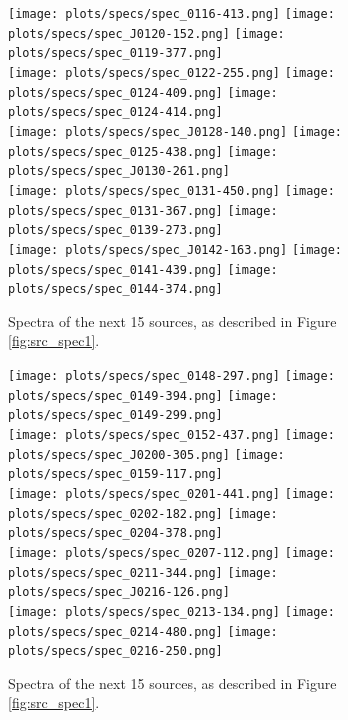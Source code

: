 \documentclass[preprint]{aastex}
\begin{document}
\begin{figure}\centering
\texttt{[image: plots/specs/spec\_0116-413.png]}
\texttt{[image: plots/specs/spec\_J0120-152.png]}
\texttt{[image: plots/specs/spec\_0119-377.png]}\\
\texttt{[image: plots/specs/spec\_0122-255.png]}
\texttt{[image: plots/specs/spec\_0124-409.png]}
\texttt{[image: plots/specs/spec\_0124-414.png]}\\
\texttt{[image: plots/specs/spec\_J0128-140.png]}
\texttt{[image: plots/specs/spec\_0125-438.png]}
\texttt{[image: plots/specs/spec\_J0130-261.png]}\\
\texttt{[image: plots/specs/spec\_0131-450.png]}
\texttt{[image: plots/specs/spec\_0131-367.png]}
\texttt{[image: plots/specs/spec\_0139-273.png]}\\
\texttt{[image: plots/specs/spec\_J0142-163.png]}
\texttt{[image: plots/specs/spec\_0141-439.png]}
\texttt{[image: plots/specs/spec\_0144-374.png]}\\
\caption{Spectra of the next 15 sources, as described in Figure \ref{fig:src_spec1}.
}\label{fig:src_spec4}
\end{figure}\clearpage

\begin{figure}\centering
\texttt{[image: plots/specs/spec\_0148-297.png]}
\texttt{[image: plots/specs/spec\_0149-394.png]}
\texttt{[image: plots/specs/spec\_0149-299.png]}\\
\texttt{[image: plots/specs/spec\_0152-437.png]}
\texttt{[image: plots/specs/spec\_J0200-305.png]}
\texttt{[image: plots/specs/spec\_0159-117.png]}\\
\texttt{[image: plots/specs/spec\_0201-441.png]}
\texttt{[image: plots/specs/spec\_0202-182.png]}
\texttt{[image: plots/specs/spec\_0204-378.png]}\\
\texttt{[image: plots/specs/spec\_0207-112.png]}
\texttt{[image: plots/specs/spec\_0211-344.png]}
\texttt{[image: plots/specs/spec\_J0216-126.png]}\\
\texttt{[image: plots/specs/spec\_0213-134.png]}
\texttt{[image: plots/specs/spec\_0214-480.png]}
\texttt{[image: plots/specs/spec\_0216-250.png]}\\
\caption{Spectra of the next 15 sources, as described in Figure \ref{fig:src_spec1}.
}\label{fig:src_spec5}
\end{figure}\clearpage
\end{document}
